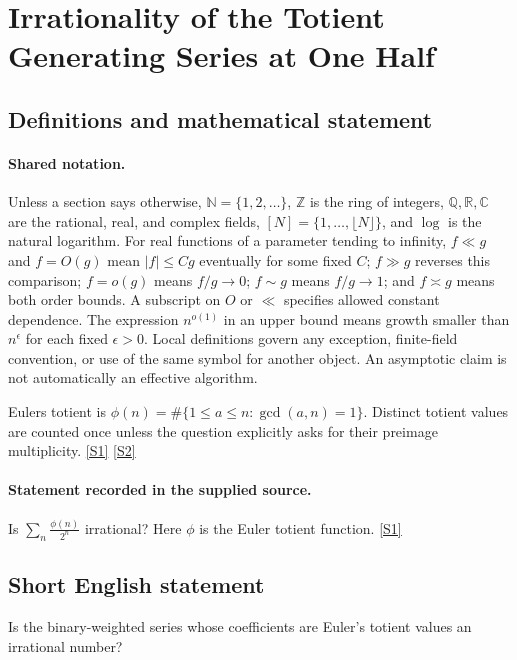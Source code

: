 \documentclass[11pt,a4paper]{article}
\newcommand{\N}{\mathbb{N}}
\newcommand{\Z}{\mathbb{Z}}
\newcommand{\Q}{\mathbb{Q}}
\newcommand{\R}{\mathbb{R}}
\newcommand{\C}{\mathbb{C}}
\newcommand{\sref}[2]{\hyperlink{source:#1:#2}{[S#2]}}
\begin{document}
\section{Irrationality of the Totient Generating Series at One Half}\label{statement}


\subsection{Definitions and mathematical statement}

\paragraph{Shared notation.}Unless a section says otherwise, $\N=\{1,2,\ldots\}$,
$\Z$ is the ring of integers, $\Q,\R,\C$ are the rational, real, and complex
fields, $[N]=\{1,\ldots,\lfloor N\rfloor\}$, and $\log$ is the natural
logarithm. For real functions of a parameter tending to infinity,
$f\ll g$ and $f=O(g)$ mean $|f|\leq Cg$ eventually for some fixed $C$;
$f\gg g$ reverses this comparison; $f=o(g)$ means $f/g\to0$;
$f\sim g$ means $f/g\to1$; and $f\asymp g$ means both order bounds.
A subscript on $O$ or $\ll$ specifies allowed constant dependence.
The expression $n^{o(1)}$ in an upper bound means growth smaller than
$n^\epsilon$ for each fixed $\epsilon>0$. Local definitions govern any
exception, finite-field convention, or use of the same symbol for another
object. An asymptotic claim is not automatically an effective algorithm.



Euler\textquotesingle s totient is $\phi(n)=\#\{1\leq a\leq n:\gcd(a,n)=1\}$. Distinct totient values are counted once unless the question explicitly asks for their preimage multiplicity. \sref{statement}{1} \sref{statement}{2}

\paragraph{Statement recorded in the supplied source.}
Is $ \sum_n \frac{\phi(n)}{2^n} $ irrational? Here $\phi$ is the Euler totient function. \sref{statement}{1}

\subsection{Short English statement}

Is the binary-weighted series whose coefficients are Euler's totient values an irrational number?
\end{document}
